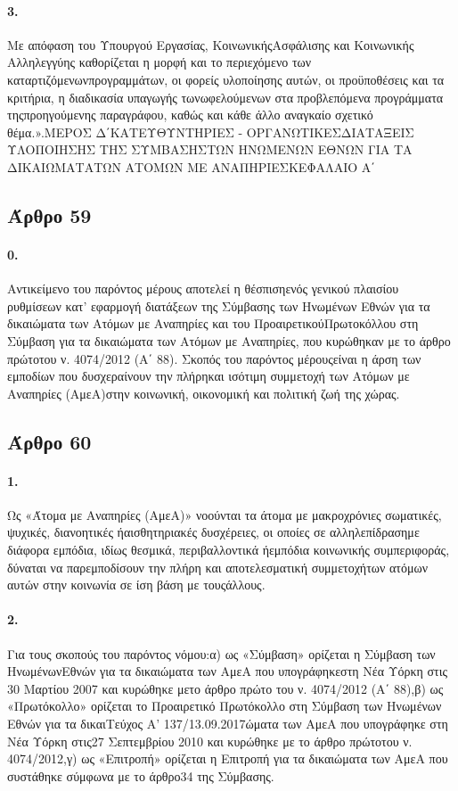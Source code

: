 \documentclass[a4paper,oneside, 10pt]{book}
\begin{document}
\paragraph { 3. } Με απόφαση του Υπουργού Εργασίας, ΚοινωνικήςΑσφάλισης και Κοινωνικής Αλληλεγγύης καθορίζεται η μορφή και το περιεχόμενο των καταρτιζόμενωνπρογραμμάτων, οι φορείς υλοποίησης αυτών, οι προϋποθέσεις και τα κριτήρια, η διαδικασία υπαγωγής τωνωφελούμενων στα προβλεπόμενα προγράμματα τηςπροηγούμενης παραγράφου, καθώς και κάθε άλλο αναγκαίο σχετικό θέμα.».ΜΕΡΟΣ Δ΄ΚΑΤΕΥΘΥΝΤΗΡΙΕΣ - ΟΡΓΑΝΩΤΙΚΕΣΔΙΑΤΑΞΕΙΣ ΥΛΟΠΟΙΗΣΗΣ ΤΗΣ ΣΥΜΒΑΣΗΣΤΩΝ ΗΝΩΜΕΝΩΝ ΕΘΝΩΝ ΓΙΑ ΤΑ ΔΙΚΑΙΩΜΑΤΑΤΩΝ ΑΤΟΜΩΝ ΜΕ ΑΝΑΠΗΡΙΕΣΚΕΦΑΛΑΙΟ Α΄
\subsection*{ Άρθρο 59 }
\paragraph { 0. } Αντικείμενο του παρόντος μέρους αποτελεί η θέσπισηενός γενικού πλαισίου ρυθμίσεων κατ’ εφαρμογή διατάξεων της Σύμβασης των Ηνωμένων Εθνών για τα δικαιώματα των Ατόμων με Αναπηρίες και του ΠροαιρετικούΠρωτοκόλλου στη Σύμβαση για τα δικαιώματα των Ατόμων με Αναπηρίες, που κυρώθηκαν με το άρθρο πρώτοτου ν. 4074/2012 (Α΄ 88). Σκοπός του παρόντος μέρουςείναι η άρση των εμποδίων που δυσχεραίνουν την πλήρηκαι ισότιμη συμμετοχή των Ατόμων με Αναπηρίες (ΑμεΑ)στην κοινωνική, οικονομική και πολιτική ζωή της χώρας.
\subsection*{ Άρθρο 60 }
\paragraph { 1. } Ως «Άτομα με Αναπηρίες (ΑμεΑ)» νοούνται τα άτομα με μακροχρόνιες σωματικές, ψυχικές, διανοητικές ήαισθητηριακές δυσχέρειες, οι οποίες σε αλληλεπίδρασημε διάφορα εμπόδια, ιδίως θεσμικά, περιβαλλοντικά ήεμπόδια κοινωνικής συμπεριφοράς, δύναται να παρεμποδίσουν την πλήρη και αποτελεσματική συμμετοχήτων ατόμων αυτών στην κοινωνία σε ίση βάση με τουςάλλους.
\paragraph { 2. } Για τους σκοπούς του παρόντος νόμου:α) ως «Σύμβαση» ορίζεται η Σύμβαση των ΗνωμένωνΕθνών για τα δικαιώματα των ΑμεΑ που υπογράφηκεστη Νέα Υόρκη στις 30 Μαρτίου 2007 και κυρώθηκε μετο άρθρο πρώτο του ν. 4074/2012 (Α΄ 88),β) ως «Πρωτόκολλο» ορίζεται το Προαιρετικό Πρωτόκολλο στη Σύμβαση των Ηνωμένων Εθνών για τα δικαιΤεύχος Α’ 137/13.09.2017ώματα των ΑμεΑ που υπογράφηκε στη Νέα Υόρκη στις27 Σεπτεμβρίου 2010 και κυρώθηκε με το άρθρο πρώτοτου ν. 4074/2012,γ) ως «Επιτροπή» ορίζεται η Επιτροπή για τα δικαιώματα των ΑμεΑ που συστάθηκε σύμφωνα με το άρθρο34 της Σύμβασης.
\end{document}
